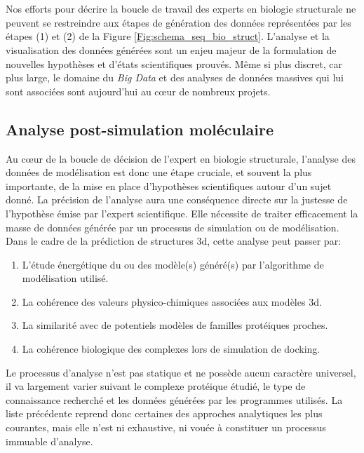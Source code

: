 
\chapter[La visualisation analytique, outil de la Réalité Virtuelle]{}
\label{Sec:VisuAna_def}
\minitoc
\cleardoublepage

Nos efforts pour décrire la boucle de travail des experts en biologie structurale ne peuvent se restreindre aux étapes de génération des données représentées par les étapes (1) et (2) de la Figure \ref{Fig:schema_seq_bio_struct}. L'analyse et la visualisation des données générées sont un enjeu majeur de la formulation de nouvelles hypothèses et d'états scientifiques prouvés. 
Même si plus discret, car plus large, le domaine du \textit{Big Data} et des analyses de données massives qui lui sont associées sont aujourd'hui au cœur de nombreux projets.

\section{Analyse post-simulation moléculaire}

Au cœur de la boucle de décision de l'expert en biologie structurale, l'analyse des données de modélisation est donc une étape cruciale, et souvent la plus importante, de la mise en place d'hypothèses scientifiques autour d'un sujet donné. La précision de l'analyse aura une conséquence directe sur la justesse de l'hypothèse émise par l'expert scientifique. Elle nécessite de traiter efficacement la masse de données générée par un processus de simulation ou de modélisation. Dans le cadre de la prédiction de structures 3d, cette analyse peut passer par:

\begin{enumerate}
  \item L'étude énergétique du ou des modèle(s) généré(s) par l'algorithme de modélisation utilisé.
  \item La cohérence des valeurs physico-chimiques associées aux modèles 3d.
  \item La similarité avec de potentiels modèles de familles protéiques proches.
  \item La cohérence biologique des complexes lors de simulation de docking.
\end{enumerate}

Le processus d'analyse n'est pas statique et ne possède aucun caractère universel, il va largement varier suivant le complexe protéique étudié, le type de connaissance recherché et les données générées par les programmes utilisés. La liste précédente reprend donc certaines des approches analytiques les plus courantes, mais elle n'est ni exhaustive, ni vouée à constituer un processus immuable d'analyse.

